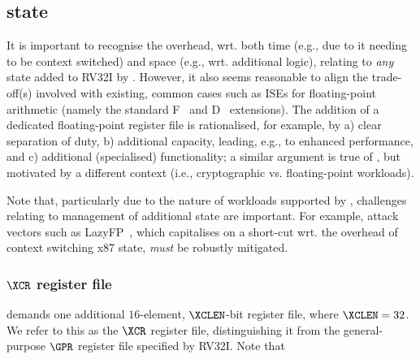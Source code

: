 \subsection{\XCID state}
\label{sec:spec:state}

It is important to recognise the overhead, wrt. both 
time  (e.g., due to it needing to be context switched) 
and 
space (e.g., wrt. additional logic),
relating to {\em any} state added to RV32I by \XCID.
However, it also seems reasonable to align the trade-off(s) involved with 
existing, common cases such as ISEs for floating-point arithmetic (namely
the standard 
F~\cite[Section 8]{SCARV:RV:ISA:I:17}
and
D~\cite[Section 9]{SCARV:RV:ISA:I:17}
extensions).  The addition of a dedicated floating-point register file is
rationalised, for example, by
a) clear separation of duty,
b) additional capacity, leading, e.g., to enhanced performance,
   and
c) additional (specialised) functionality;
a similar argument is true of \XCID, but motivated by a different context
(i.e., cryptographic vs. floating-point workloads).

Note that, particularly due to the nature of workloads supported by \XCID,
challenges relating to management of additional state are important.  For
example, attack vectors such as 
LazyFP~\cite{SCARV:StePre:18}, 
which capitalises on a short-cut wrt. the overhead of context switching
x87 state, {\em must} be robustly mitigated.


\subsubsection{$\XCR$ register file}
\label{sec:spec:state:xcr}

\XCID 
demands one additional 
$16$-element, $\XCLEN$-bit register file,
where $\XCLEN = 32$.
We refer to this as the $\XCR$ register file, distinguishing it from the
general-purpose $\GPR$ register file specified by RV32I.
Note that

